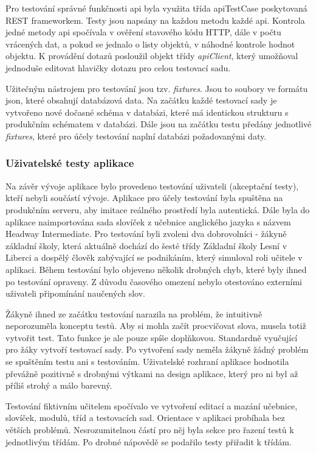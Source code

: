 \documentclass[a4paper,11pt,titlepage,fleqn]{article}
\begin{document}
        Pro testování správné funkčnosti \gls{api} byla využita třída \gls{api}TestCase poskytovaná REST frameworkem. Testy jsou napsány na každou metodu každé \gls{api}. Kontrola jedné metody \gls{api} spočívala v ověření stavového kódu HTTP, dále v počtu vrácených dat, a pokud se jednalo o listy objektů, v náhodné kontrole hodnot objektu. K provádění dotazů posloužil objekt třídy \textit{\gls{api}Client}, který umožňoval jednoduše editovat hlavičky dotazu pro celou testovací sadu. 

        Užitečným nástrojem pro testování jsou tzv. \textit{fixtures}. Jsou to soubory ve formátu \gls{json}, které obsahují databázová data. Na začátku každé testovací sady je vytvořeno nové dočasné schéma v databázi, které má identickou strukturu s produkčním schématem v databázi. Dále jsou na začátku testu předány jednotlivé \textit{fixtures}, které pro účely testování naplní databázi požadovanými daty.

        \subsubsection{Uživatelské testy aplikace}
            Na závěr vývoje aplikace bylo provedeno testování uživateli (akceptační testy), kteří nebyli součástí vývoje. Aplikace pro účely testování byla spuštěna na produkčním serveru, aby imitace reálného prostředí byla autentická. Dále byla do aplikace naimportována sada slovíček z učebnice anglického jazyka s názvem Headway Intermediate. Pro testování byli zvoleni dva dobrovolníci - žákyně základní školy, která aktuálně dochází do šesté třídy Základní školy Lesní v Liberci a dospělý člověk zabývající se podnikáním, který simuloval roli učitele v aplikaci. Během testování bylo objeveno několik drobných chyb, které byly ihned po testování opraveny. Z důvodu časového omezení nebylo otestováno externími uživateli připomínání naučených slov.

            Žákyně ihned ze začátku testování narazila na problém, že intuitivně neporozuměla konceptu testů. Aby si mohla začít procvičovat slova, musela totiž vytvořit test. Tato funkce je ale pouze spíše doplňkovou. Standardně vyučující pro žáky vytvoří testovací sady. Po vytvoření sady neměla žákyně žádný problém se spuštěním testu ani s testováním. Uživatelské rozhraní aplikace hodnotila převážně pozitivně s  drobnými výtkami na design aplikace, který pro ni byl až příliš strohý a málo barevný.

            Testování fiktivním učitelem spočívalo ve vytvoření editací a mazání učebnice, slovíček, modulů, tříd a testovacích sad. Orientace v aplikaci probíhala bez větších problémů. Nesrozumitelnou částí pro něj byla sekce pro řazení testů k jednotlivým třídám. Po drobné nápovědě se podařilo testy přiřadit k třídám.
\end{document}
